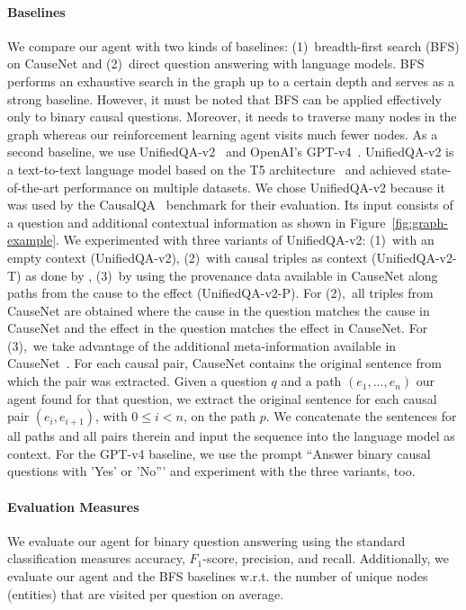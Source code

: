 \paragraph{Baselines}
We compare our agent with two kinds of baselines: (1)~breadth-first search (BFS) on CauseNet and (2)~direct question answering with language models. BFS performs an exhaustive search in the graph up to a certain depth and serves as a strong baseline. However, it must be noted that BFS can be applied effectively only to binary causal questions. Moreover, it needs to traverse many nodes in the graph whereas our reinforcement learning agent visits much fewer nodes. As a second baseline, we use UnifiedQA-v2~\cite{Khashabi2020UnifiedQA, Khashabi2022UnifiedQA2} and OpenAI's GPT-v4~\cite{OpenAI2023GPT4}. UnifiedQA-v2 is a text-to-text language model based on the T5 architecture~\cite{Raffel2020T5} and achieved state-of-the-art performance on multiple datasets. We chose UnifiedQA-v2 because it was used by the CausalQA~\cite{Bondarenko2022CausalQA} benchmark for their evaluation. Its input consists of a question and additional contextual information as shown in Figure~\ref{fig:graph-example}. We experimented with three variants of UnifiedQA-v2:
(1)~with an empty context (UnifiedQA-v2),
(2)~with causal triples as context (UnifiedQA-v2-T) as done by \cite{DalalCausalQAEnhancing2021, DalalCausalQAISWC2021},
(3)~by using the provenance data available in CauseNet along paths from the cause to the effect (UnifiedQA-v2-P).
For (2),~all triples from CauseNet are obtained where the cause in the question matches the cause in CauseNet and the effect in the question matches the effect in CauseNet.
For (3),~we take advantage of the additional meta-information available in CauseNet~\cite{Heindorf2020Causenet}. For each causal pair, CauseNet contains the original sentence from which the pair was extracted. Given a question $q$ and a path $(e_1, \dots, e_n)$ our agent found for that question, we extract the original sentence for each causal pair $(e_i, e_{i+1})$, with $0 \leq i < n$, on the path $p$. We concatenate the sentences for all paths and all pairs therein and input the sequence into the language model as context. For the GPT-v4 baseline, we use the prompt ``Answer binary causal questions with 'Yes' or 'No''' and experiment with the three variants, too.

\paragraph{Evaluation Measures}
We evaluate our agent for binary question answering using the standard classification measures accuracy, $F_1$-score, precision, and recall. Additionally, we evaluate our agent and the BFS baselines w.r.t. the number of unique nodes (entities) that are visited per question on average.

